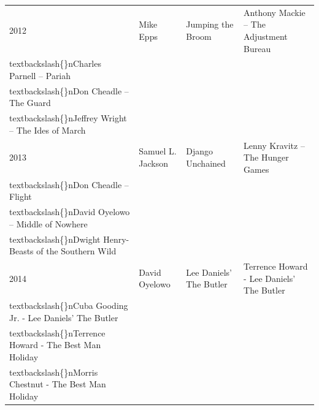 \documentclass{article}
\begin{document}
\begin{tabular}{llll}
2012 & Mike Epps & Jumping the Broom & Anthony Mackie – The Adjustment Bureau\\textbackslash\{\}nCharles Parnell – Pariah\\textbackslash\{\}nDon Cheadle – The Guard\\textbackslash\{\}nJeffrey Wright – The Ides of March \\
2013 & Samuel L. Jackson & Django Unchained & Lenny Kravitz – The Hunger Games\\textbackslash\{\}nDon Cheadle – Flight\\textbackslash\{\}nDavid Oyelowo – Middle of Nowhere\\textbackslash\{\}nDwight Henry-Beasts of the Southern Wild \\
2014 & David Oyelowo & Lee Daniels' The Butler & Terrence Howard - Lee Daniels' The Butler\\textbackslash\{\}nCuba Gooding Jr. - Lee Daniels' The Butler\\textbackslash\{\}nTerrence Howard - The Best Man Holiday\\textbackslash\{\}nMorris Chestnut - The Best Man Holiday \\
\bottomrule
\end{tabular}
\end{document}
